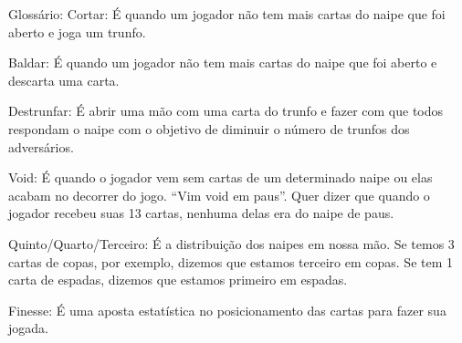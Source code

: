 \begin{subsecao}{Glossário:}
Cortar:  É quando um jogador não tem mais cartas do naipe que foi aberto e joga
um trunfo.

Baldar: É quando um jogador não tem mais cartas do naipe que foi aberto e
descarta uma carta.

Destrunfar: É abrir uma mão com uma carta do trunfo e fazer com que todos
respondam o naipe com o objetivo de diminuir o número de trunfos dos
adversários.

Void: É quando o jogador vem sem cartas de um determinado naipe ou elas acabam
no decorrer do jogo. “Vim void em paus”. Quer dizer que quando o jogador
recebeu suas 13 cartas, nenhuma delas era do naipe de paus.

Quinto/Quarto/Terceiro: É a distribuição dos naipes em nossa mão. Se temos 3
cartas de copas, por exemplo, dizemos que estamos terceiro em copas. Se tem 1
carta de espadas, dizemos que estamos primeiro em espadas.

Finesse: É uma aposta estatística no posicionamento das cartas para
fazer sua jogada.

\end{subsecao}
